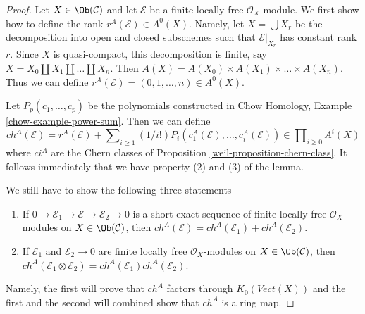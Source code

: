 \begin{proof}

Let $X \in \Ob(\mathcal{C})$ and let $\mathcal{E}$ be a finite
locally free $\mathcal{O}_X$-module. We first show how to define
the rank $r^A(\mathcal{E}) \in A^0(X)$. Namely, let $X = \bigcup X_r$
be the decomposition into open and closed subschemes such that
$\mathcal{E}|_{X_r}$ has constant rank $r$. Since $X$ is quasi-compact, this
decomposition is finite, say $X = X_0 \amalg X_1 \amalg \ldots \amalg X_n$.
Then $A(X) = A(X_0) \times A(X_1) \times \ldots \times A(X_n)$. Thus we
can define $r^A(\mathcal{E}) = (0, 1, \ldots, n) \in A^0(X)$.

\medskip\noindent
Let $P_p(c_1, \ldots, c_p)$ be the polynomials constructed in
Chow Homology, Example \ref{chow-example-power-sum}.
Then we can define
$$
ch^A(\mathcal{E}) = r^A(\mathcal{E}) +
\sum\nolimits_{i \geq 1} (1/i!)
P_i(c^A_1(\mathcal{E}), \ldots, c^A_i(\mathcal{E}))
\in \prod\nolimits_{i \geq 0} A^i(X)
$$
where $ci^A$ are the Chern classes of
Proposition \ref{weil-proposition-chern-class}.
It follows immediately that we have property (2) and (3) of the lemma.

\medskip\noindent
We still have to show the following three statements
\begin{enumerate}
\item If $0 \to \mathcal{E}_1 \to \mathcal{E} \to \mathcal{E}_2 \to 0$
is a short exact sequence of finite locally free $\mathcal{O}_X$-modules
on $X \in \Ob(\mathcal{C})$, then
$ch^A(\mathcal{E}) = ch^A(\mathcal{E}_1) + ch^A(\mathcal{E}_2)$.
\item If $\mathcal{E}_1$ and $\mathcal{E}_2 \to 0$ are finite locally free
$\mathcal{O}_X$-modules on $X \in \Ob(\mathcal{C})$, then
$ch^A(\mathcal{E}_1 \otimes \mathcal{E}_2) =
ch^A(\mathcal{E}_1) ch^A(\mathcal{E}_2)$.
\end{enumerate}
Namely, the first will prove that $ch^A$ factors through
$K_0(\textit{Vect}(X))$ and the first and the second will combined
show that $ch^A$ is a ring map.


\end{proof}

